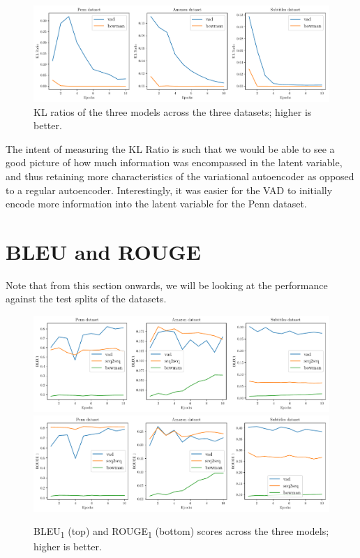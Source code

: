 \documentclass[12pt,twoside]{report}
\begin{document}
\begin{figure}[!ht]
	\centering
	\includegraphics[width=150mm]{results/kl_ratio.pdf}
	\caption{KL ratios of the three models across the three datasets; higher is better.\label{r:kl_ratio}}
  \end{figure}

The intent of measuring the KL Ratio is such that we would be able to see a good picture of how much information was encompassed in the latent variable, and thus retaining more characteristics of the variational autoencoder as opposed to a regular autoencoder. Interestingly, it was easier for the VAD to initially encode more information into the latent variable for the Penn dataset.


\section{BLEU and ROUGE}

Note that from this section onwards, we will be looking at the performance against the test splits of the datasets. 

\begin{figure}[!ht]
	\centering
	\includegraphics[width=150mm]{results/bleu1.pdf}
	\includegraphics[width=150mm]{results/rouge_1.pdf}
	\caption{BLEU\textsubscript{1} (top) and ROUGE\textsubscript{1} (bottom) scores across the three models; higher is better.\label{r:bleu_rouge}}
  \end{figure}
\end{document}
